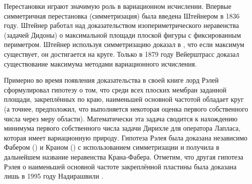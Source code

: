 


{\actuality}



Перестановки играют значимую роль в вариационном исчислении.
Впервые симметричная перестановка (симметризация) была введена Штейнером в 1836 году.
Штейнер работал над доказательством изопериметрического неравенства (задачей Дидоны)
о максимальной площади плоской фигуры с фиксированным периметром.
Штейнер используя симметризацию доказал в \cite{Steiner}, что если максимум существует, он достигается на круге.
Только в 1879 году Вейерштрасс доказал существование максимума методами вариационного исчисления.

Примерно во время появления доказательства в своей книге \cite{Rayleigh} лорд Рэлей сформулировал гипотезу
о том, что среди всех плоских мембран заданной площади, закреплённых по краю, наименьшей основной частотой обладает круг
(а точнее, предположил, что выполняется некоторая оценка первого собственного числа через меру области).
Математически эта задача сводится к нахождению минимума первого собственного числа задачи Дирихле для оператора Лапласа,
которая имеет вариационную природу.
Гипотеза Рэлея была доказана независимо Фабером (\cite{Faber}) и Краном (\cite{Krahn})
с использованием симметризации и получила в дальнейшем название неравенства Крана-Фабера.
Отметим, что другая гипотеза Рэлея о наименьшей основной частоте закреплённой пластины
была доказана лишь в 1995 году Надирашвили \cite{Nadirashvili}.

